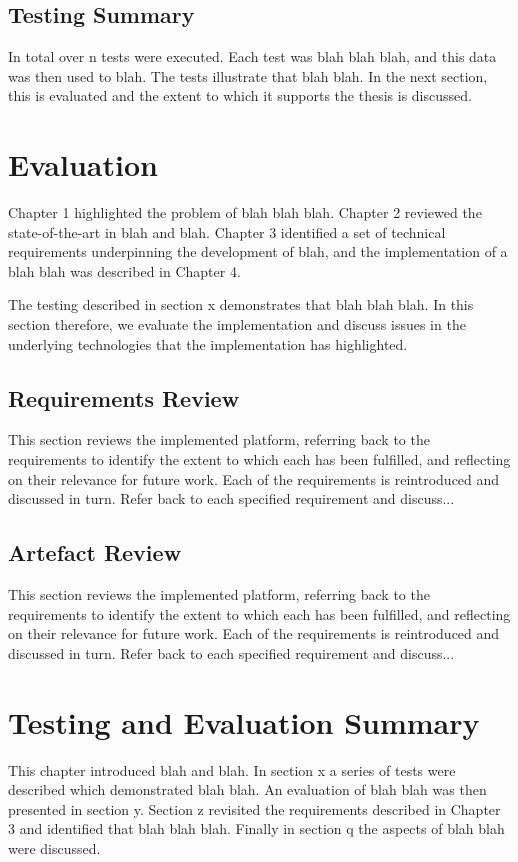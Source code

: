 \subsection{Testing Summary}

In total over n tests were executed. Each test was blah blah blah, and this data was then used to blah. The tests illustrate that blah blah. In the next section, this is evaluated and the extent to which it supports the thesis is discussed.



\section{Evaluation}

Chapter 1 highlighted the problem of blah blah blah. Chapter 2 reviewed the state-of-the-art in blah and blah.  Chapter 3 identified a set of technical requirements underpinning the development of blah, and the implementation of a blah blah was described in Chapter 4.

The testing described in section x demonstrates that blah blah blah. In this section therefore, we evaluate the implementation and discuss issues in the underlying technologies that the implementation has highlighted.

    \subsection{Requirements Review} \label{s-i--requirements-review}

    This section reviews the implemented platform, referring back to the requirements to identify the extent to which each has been fulfilled, and reflecting on their relevance for future work. Each of the requirements is reintroduced and discussed in turn.
    Refer back to each specified requirement and discuss...


    \subsection{Artefact Review} \label{s-i--artefact-review}

    This section reviews the implemented platform, referring back to the requirements to identify the extent to which each has been fulfilled, and reflecting on their relevance for future work. Each of the requirements is reintroduced and discussed in turn.
    Refer back to each specified requirement and discuss...

\section{Testing and Evaluation Summary}

This chapter introduced blah and blah.  In section x a series of tests were described which demonstrated blah blah.
An evaluation of blah blah was then presented in section y.  Section z revisited the requirements described in Chapter 3 and identified that blah blah blah. Finally in section q the aspects of blah blah were discussed.
